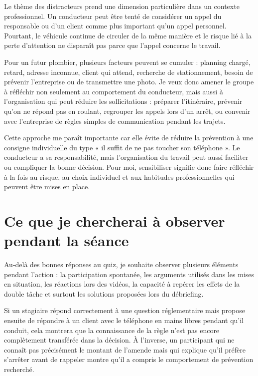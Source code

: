 Le thème des distracteurs prend une dimension particulière dans un contexte professionnel. Un conducteur peut être tenté de considérer un appel du responsable ou d’un client comme plus important qu’un appel personnel. Pourtant, le véhicule continue de circuler de la même manière et le risque lié à la perte d’attention ne disparaît pas parce que l’appel concerne le travail.

Pour un futur plombier, plusieurs facteurs peuvent se cumuler : planning chargé, retard, adresse inconnue, client qui attend, recherche de stationnement, besoin de prévenir l’entreprise ou de transmettre une photo. Je veux donc amener le groupe à réfléchir non seulement au comportement du conducteur, mais aussi à l’organisation qui peut réduire les sollicitations : préparer l’itinéraire, prévenir qu’on ne répond pas en roulant, regrouper les appels lors d’un arrêt, ou convenir avec l’entreprise de règles simples de communication pendant les trajets.

Cette approche me paraît importante car elle évite de réduire la prévention à une consigne individuelle du type « il suffit de ne pas toucher son téléphone ». Le conducteur a sa responsabilité, mais l’organisation du travail peut aussi faciliter ou compliquer la bonne décision. Pour moi, sensibiliser signifie donc faire réfléchir à la fois au risque, au choix individuel et aux habitudes professionnelles qui peuvent être mises en place.

\section{Ce que je chercherai à observer pendant la séance}

Au-delà des bonnes réponses au quiz, je souhaite observer plusieurs éléments pendant l’action : la participation spontanée, les arguments utilisés dans les mises en situation, les réactions lors des vidéos, la capacité à repérer les effets de la double tâche et surtout les solutions proposées lors du débriefing.

Si un stagiaire répond correctement à une question réglementaire mais propose ensuite de répondre à un client avec le téléphone en mains libres pendant qu’il conduit, cela montrera que la connaissance de la règle n’est pas encore complètement transférée dans la décision. À l’inverse, un participant qui ne connaît pas précisément le montant de l’amende mais qui explique qu’il préfère s’arrêter avant de rappeler montre qu’il a compris le comportement de prévention recherché.

